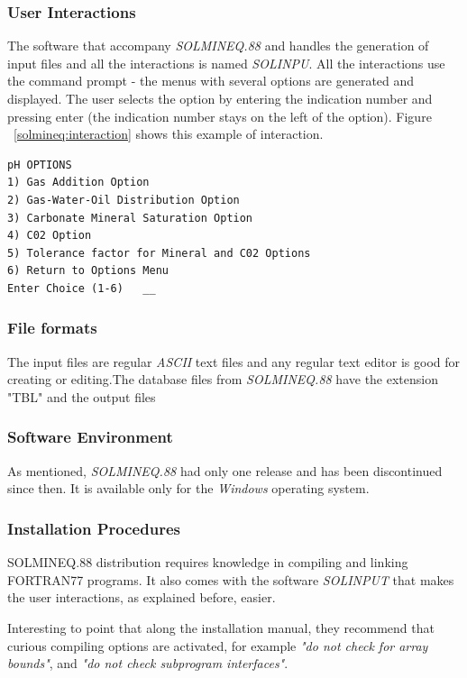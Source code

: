 \documentclass[ppgc,mestrado,English]{iiufrgs}
\begin{document}
\subsubsection{User Interactions}
The software that accompany \emph{SOLMINEQ.88} and handles the generation of input files and all the interactions is named \emph{SOLINPU}. All the interactions use the command prompt - the menus with several options are generated and displayed. The user selects the option by entering the indication number and pressing enter (the indication number stays on the left of the option). Figure ~\ref{solmineq:interaction} shows this example of interaction.

\begin{minipage}[c]{0.93\textwidth}
\begin{lstlisting}[frame=single, caption=\emph{SOLMINEQ.88}'s example of user interaction, label=solmineq:interaction]
	pH OPTIONS
1) Gas Addition Option
2) Gas-Water-Oil Distribution Option
3) Carbonate Mineral Saturation Option
4) C02 Option
5) Tolerance factor for Mineral and C02 Options
6) Return to Options Menu
Enter Choice (1-6)   __
\end{lstlisting}
\end{minipage}

\subsubsection{File formats}
The input files are regular \emph{ASCII} text files and any regular text editor is good for creating or editing.The database files from \emph{SOLMINEQ.88} have the extension "TBL" and the output files 

\subsubsection{Software Environment}
As mentioned, \emph{SOLMINEQ.88} had only one release and has been discontinued since then. It is available only for the \emph{Windows} operating system.

\subsubsection{Installation Procedures}
SOLMINEQ.88 distribution requires knowledge in compiling and linking FORTRAN77 programs. It also comes with the software \emph{SOLINPUT} that makes the user interactions, as explained before, easier.

Interesting to point that along the installation manual, they recommend  that curious compiling options are activated, for example \emph{"do not check for array bounds"}, and \emph{"do not check subprogram interfaces"}.
\end{document}
